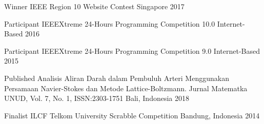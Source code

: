 
\begin{cvhonors}

  \cvhonor
    {Winner} %
    {IEEE Region 10 Website Contest} %
    {Singapore} %
    {2017} %

  \cvhonor
    {Participant} %
    {IEEEXtreme 24-Hours Programming Competition 10.0} %
    {Internet-Based} %
    {2016} %

  \cvhonor
    {Participant} %
    {IEEEXtreme 24-Hours Programming Competition 9.0} %
    {Internet-Based} %
    {2015} %

\end{cvhonors}

\begin{cvhonors}

  \cvhonor
    {Published} %
    {Analisis Aliran Darah dalam Pembuluh Arteri Menggunakan Persamaan Navier-Stokes dan Metode Lattice-Boltzmann. Jurnal Matematka UNUD, Vol. 7, No. 1, ISSN:2303-1751} %
    {Bali, Indonesia} %
    {2018} %

  \cvhonor
    {Finalist} %
    {ILCF Telkom University Scrabble Competition} %
    {Bandung, Indonesia} %
    {2014} %

\end{cvhonors}
